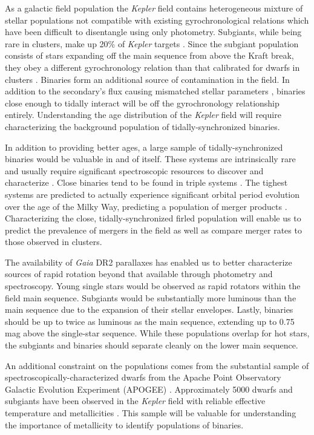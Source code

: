 \documentclass[manuscript]{aastex6}
\newcommand{\Kepler}{\mbox{\textit{Kepler}}}
\newcommand{\Gaia}{\mbox{\textit{Gaia}}}
\begin{document}
As a galactic field population the \Kepler{} field contains heterogeneous
mixture of stellar populations not compatible with existing gyrochronological
relations which have been difficult to disentangle using only photometry.
Subgiants, while being rare in clusters, make up 20\% of \Kepler{} targets
\citep{Gaidos13, Berger18b}. Since the subgiant population consists of stars
expanding off the main sequence from above the Kraft break, they obey a
different gyrochronology relation than that calibrated for dwarfs in clusters
\citep{vanSaders13}. Binaries form an additional source of contamination in the
field. In addition to the secondary's flux causing mismatched stellar
parameters \citep{ElBadry18,Jackson18}, binaries close enough to tidally
interact will be off the gyrochronology relationship entirely. Understanding
the age distribution of the \Kepler{} field will require characterizing the
background population of tidally-synchronized binaries.

In addition to providing better ages, a large sample of tidally-synchronized
binaries would be valuable in and of itself. These systems are intrinsically
rare and usually require significant spectroscopic resources to discover and
characterize \citep{Mathieu90, Raghavan10, Geller15}. Close binaries tend to be
found in triple systems \citep{Tokovinin06}. The tighest systems are predicted
to actually experience significant orbital period evolution over the age of the
Milky Way, predicting a population of merger products \citep{Andronov06}.
Characterizing the close, tidally-synchronized firled population will enable us
to predict the prevalence of mergers in the field as well as compare merger
rates to those observed in clusters.

The availability of \Gaia{} DR2 parallaxes \citep{Gaia18,Lindegren18} has
enabled us to better characterize sources of rapid rotation beyond that
available through photometry and spectroscopy. Young single stars would be
observed as rapid rotators within the field main sequence. Subgiants would be
substantially more luminous than the main sequence due to the expansion of
their stellar envelopes. Lastly, binaries should be up to twice as luminous as
the main sequence, extending up to 0.75 mag above the single-star sequence.
While these populations overlap for hot stars, the subgiants and binaries
should separate cleanly on the lower main sequence.

An additional constraint on the populations comes from the substantial sample
of spectroscopically-characterized dwarfs from the Apache Point Observatory
Galactic Evolution Experiment (APOGEE) \citep{Majewski17}. Approximately 5000 dwarfs and subgiants
have been observed in the \Kepler{} field with reliable effective temperature
and metallicities \citep{Holtzmann18}. This sample will be valuable for
understanding the importance of metallicity to identify populations of
binaries.
\end{document}
